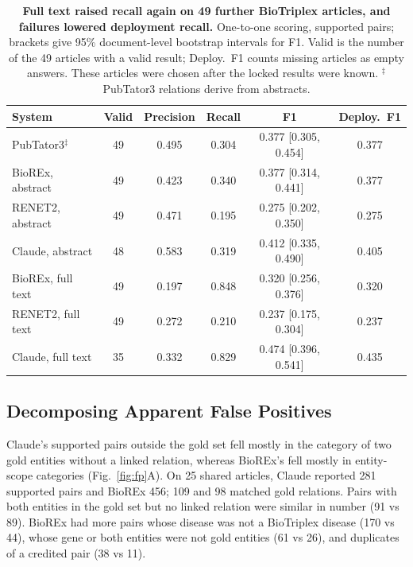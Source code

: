 \documentclass[preprint,10pt,letterpaper]{elsarticle}
\begin{document}
\begin{table}[!htbp]
\centering\footnotesize
\caption{\textbf{Full text raised recall again on 49 further BioTriplex articles, and failures lowered deployment recall.} One-to-one scoring, supported pairs; brackets give 95\% document-level bootstrap intervals for F1. Valid is the number of the 49 articles with a valid result; Deploy.\ F1 counts missing articles as empty answers. These articles were chosen after the locked results were known. $^{\ddagger}$PubTator3 relations derive from abstracts.}
\label{tab:batch2}
\begin{tabular}{@{}lccccc@{}}
\toprule
System & Valid & Precision & Recall & F1 & Deploy.\ F1\\
\midrule
PubTator3$^{\ddagger}$ & 49 & 0.495 & 0.304 & 0.377 [0.305, 0.454] & 0.377\\
BioREx, abstract & 49 & 0.423 & 0.340 & 0.377 [0.314, 0.441] & 0.377\\
RENET2, abstract & 49 & 0.471 & 0.195 & 0.275 [0.202, 0.350] & 0.275\\
Claude, abstract & 48 & 0.583 & 0.319 & 0.412 [0.335, 0.490] & 0.405\\
\addlinespace
BioREx, full text & 49 & 0.197 & 0.848 & 0.320 [0.256, 0.376] & 0.320\\
RENET2, full text & 49 & 0.272 & 0.210 & 0.237 [0.175, 0.304] & 0.237\\
Claude, full text & 35 & 0.332 & 0.829 & 0.474 [0.396, 0.541] & 0.435\\
\bottomrule
\end{tabular}
\end{table}

\subsection{Decomposing Apparent False Positives}
Claude's supported pairs outside the gold set fell mostly in the category of two gold entities without a linked relation, whereas BioREx's fell mostly in entity-scope categories (Fig.~\ref{fig:fp}A). On 25 shared articles, Claude reported 281 supported pairs and BioREx 456; 109 and 98 matched gold relations. Pairs with both entities in the gold set but no linked relation were similar in number (91 vs 89). BioREx had more pairs whose disease was not a BioTriplex disease (170 vs 44), whose gene or both entities were not gold entities (61 vs 26), and duplicates of a credited pair (38 vs 11).
\end{document}
